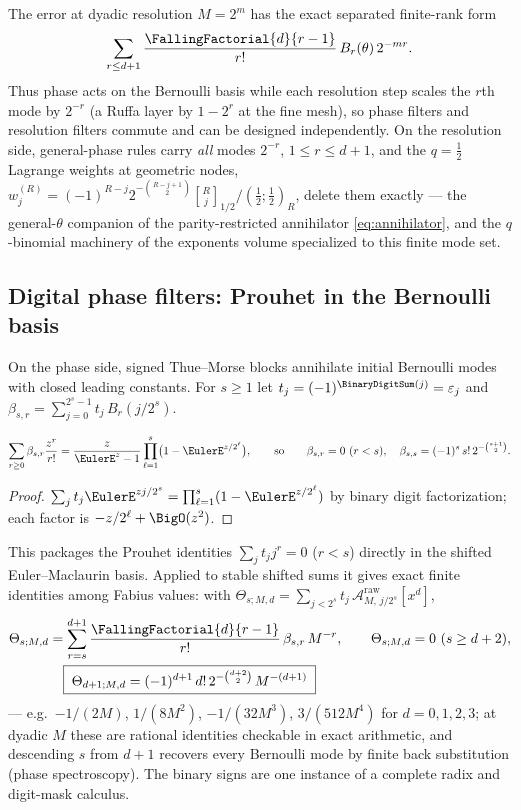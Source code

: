 The error at dyadic resolution $M=2^{m}$ has the exact separated
finite-rank form
\[
 \sum_{r\le d+1}\frac{\FallingFactorial{d}{r-1}}{r!}\,B_r(\theta)\,2^{-mr}.
\]
Thus phase
acts on the Bernoulli basis while each resolution step scales the
$r$th mode by $2^{-r}$ (a Ruffa layer by $1-2^{r}$ at the fine mesh),
so phase filters and resolution filters commute and can be designed
independently.  On the resolution side, general-phase rules carry
\emph{all} modes $2^{-r}$, $1\le r\le d+1$, and the $q=\tfrac12$
Lagrange weights at geometric nodes,
$w_j^{(R)}=(-1)^{R-j}2^{-\binom{R-j+1}2}
\genfrac{[}{]}{0pt}{}{R}{j}_{1/2}/(\tfrac12;\tfrac12)_R$, delete them
exactly --- the general-$\theta$ companion of the parity-restricted
annihilator \eqref{eq:annihilator}, and the $q$-binomial machinery of
the exponents volume specialized to this finite mode set.

\subsection{Digital phase filters: Prouhet in the Bernoulli basis}

On the phase side, signed Thue--Morse blocks annihilate initial
Bernoulli modes with closed leading constants.  For $s\ge1$ let
$t_j=(-1)^{\BinaryDigitSum(j)}=\eps_j$ and
$\beta_{s,r}=\sum_{j=0}^{2^{s}-1}t_j\,B_r(j/2^{s})$.

\begin{theorem}
\label{thm:tm-bernoulli-egf}
\begin{equation}
 \sum_{r\ge0}\beta_{s,r}\frac{z^{r}}{r!}
 =\frac{z}{\EulerE^{z}-1}\prod_{\ell=1}^{s}
 \bigl(1-\EulerE^{z/2^{\ell}}\bigr),
 \qquad\text{so}\qquad
 \beta_{s,r}=0\ (r<s),
 \quad
 \beta_{s,s}=(-1)^{s}\,s!\,2^{-\binom{s+1}2}.
 \label{eq:tm-bernoulli-egf}
\end{equation}
\end{theorem}

\begin{proof}
$\sum_j t_j\EulerE^{zj/2^{s}}=\prod_{\ell=1}^{s}(1-\EulerE^{z/2^{\ell}})$ by
binary digit factorization; each factor is
$-z/2^{\ell}+\BigO(z^{2})$.
\end{proof}

This packages the Prouhet identities $\sum_jt_jj^{r}=0$ ($r<s$)
directly in the shifted Euler--Maclaurin basis.  Applied to stable
shifted sums it gives exact finite identities among Fabius values:
with $\Theta_{s;M,d}=\sum_{j<2^{s}}t_j\,
\mathcal A^{\mathrm{raw}}_{M,\,j/2^{s}}[x^{d}]$,
\begin{align}
 \Theta_{s;M,d}
 &=\sum_{r=s}^{d+1}\frac{\FallingFactorial{d}{r-1}}{r!}\,\beta_{s,r}\,M^{-r},
 \qquad
 \Theta_{s;M,d}=0\ (s\ge d+2),
 \notag\\
 &\phantom{=}\;
 \boxed{\;\Theta_{d+1;M,d}
 =(-1)^{d+1}\,d!\,2^{-\binom{d+2}2}\,M^{-(d+1)}\;}
 \label{eq:tm-phase-filter}
\end{align}
--- e.g.\ $-1/(2M)$, $1/(8M^{2})$, $-1/(32M^{3})$, $3/(512M^{4})$ for
$d=0,1,2,3$; at dyadic $M$ these are rational identities checkable in
exact arithmetic, and descending $s$ from $d+1$ recovers every
Bernoulli mode by finite back substitution (phase spectroscopy).  The
binary signs are one instance of a complete radix and digit-mask calculus.

